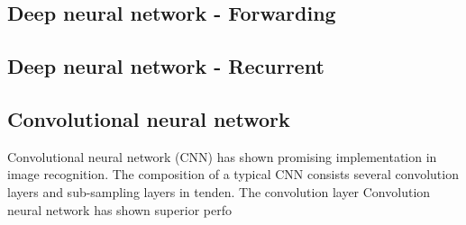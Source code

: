 \subsection{Deep neural network - Forwarding}
\subsection{Deep neural network - Recurrent}
\subsection{Convolutional neural network}
Convolutional neural network (CNN) has shown promising implementation in image recognition. The composition of a typical CNN consists several convolution layers and sub-sampling layers in tenden. The convolution layer 
Convolution neural network has shown superior perfo~\cite{Szegedy_2015}